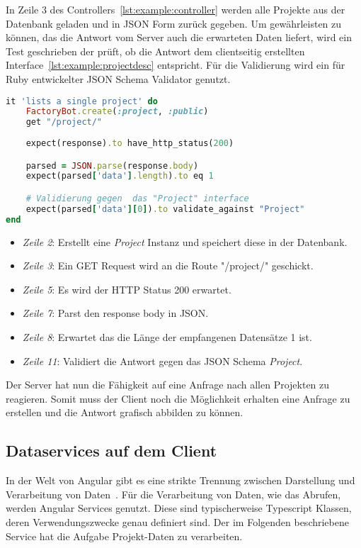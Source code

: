 In Zeile 3 des Controllers~\ref{lst:example:controller} werden alle Projekte aus der Datenbank geladen und in JSON Form
zurück gegeben. Um gewährleisten zu können, das die Antwort vom Server auch die erwarteten Daten liefert, wird ein
Test geschrieben der prüft, ob die Antwort dem clientseitig erstellten Interface~\ref{lst:example:projectdesc} entspricht.
Für die Validierung wird ein für Ruby entwickelter JSON Schema Validator genutzt.

\begin{lstlisting}[language=Ruby,float=h!,caption={Test überprüft, ob bei Anfrage der Route '/project/' eine Antwort vom Typ Project folgt}, label={lst:example:controller-test}]
it 'lists a single project' do
	FactoryBot.create(:project, :public)
	get "/project/"
	
	expect(response).to have_http_status(200)

	parsed = JSON.parse(response.body)
	expect(parsed['data'].length).to eq 1

	# Validierung gegen  das "Project" interface
	expect(parsed['data'][0]).to validate_against "Project"
end
\end{lstlisting}


\begin{itemize}
	\setlength\itemsep{-1em}
	\item \emph{Zeile 2}: Erstellt eine \emph{Project} Instanz und speichert diese in der Datenbank.
	\item \emph{Zeile 3}: Ein GET Request wird an die Route "/project/" geschickt.
	\item \emph{Zeile 5}: Es wird der HTTP Status 200 erwartet. 
	\item \emph{Zeile 7}: Parst den response body in JSON.
	\item \emph{Zeile 8}: Erwartet das die Länge der empfangenen Datensätze 1 ist.
	\item \emph{Zeile 11}: Validiert die Antwort gegen das JSON Schema \emph{Project}.
\end{itemize}

Der Server hat nun die Fähigkeit auf eine Anfrage nach allen Projekten zu reagieren.
Somit muss der Client noch die Möglichkeit erhalten eine Anfrage zu erstellen und die Antwort grafisch abbilden zu können.

\subsection{Dataservices auf dem Client}
\label{sec:requirements:example:service}
In der Welt von Angular gibt es eine strikte Trennung zwischen Darstellung und Verarbeitung von Daten~\cite{angular-service}.
Für die Verarbeitung von Daten, wie das Abrufen, werden Angular Services genutzt. Diese sind typischerweise Typescript Klassen,
deren Verwendungszwecke genau definiert sind. Der im Folgenden beschriebene Service hat die Aufgabe Projekt-Daten zu verarbeiten.

